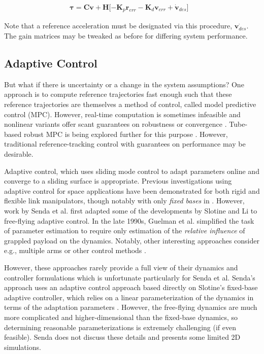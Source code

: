 \documentclass[letterpaper, 10 pt, conference]{ieeeconf}  %
\begin{document}
\begin{align}
	\bm{\tau} = \mathbf{C}\mathbf{v} + \mathbf{H}\lbrack -\mathbf{K}_p \mathbf{r}_{err} -\mathbf{K}_d \mathbf{v}_{err} + \dot{\mathbf{v}}_{des} \rbrack&
\end{align}

Note that a reference acceleration must be designated via this procedure, $\dot{\mathbf{v}_{des}}$. The gain matrices may be tweaked as before for differing system performance.

\subsection{Adaptive Control}

But what if there is uncertainty or a change in the system assumptions? One approach is to compute reference trajectories fast enough such that these reference trajectories are themselves a method of control, called model predictive control (MPC). However, real-time computation is sometimes infeasible and nonlinear variants offer scant guarantees on robustness or convergence \cite{Rybus2017}. Tube-based robust MPC is being explored further for this purpose \cite{Lopez2019} \cite{Mammarella2018}. However, traditional reference-tracking control with guarantees on performance may be desirable.

Adaptive control, which uses sliding mode control to adapt parameters online and converge to a sliding surface is appropriate. Previous investigations using adaptive control for space applications have been demonstrated for both rigid and flexible link manipulators, though notably with only \textit{fixed bases} in \cite{Ulrich2010} \cite{Ulrich2012}. However, work by Senda et al. first adapted some of the developments by Slotine and Li to free-flying adaptive control. In the late 1990s, Guelman et al. simplified the task of parameter estimation to require only estimation of the \textit{relative influence} of grappled payload on the dynamics. Notably, other interesting approaches consider e.g., multiple arms or other control methods \cite{Jia2014}.

However, these approaches rarely provide a full view of their dynamics and controller formulations which is unfortunate particularly for Senda et al. Senda's approach uses an adaptive control approach based directly on Slotine's fixed-base adaptive controller, which relies on a linear parameterization of the dynamics in terms of the adaptation parameters \cite{Slotine}. However, the free-flying dynamics are much more complicated and higher-dimensional than the fixed-base dynamics, so determining reasonable parameterizations is extremely challenging (if even feasible). Senda does not discuss these details and presents some limited 2D simulations.
\end{document}
